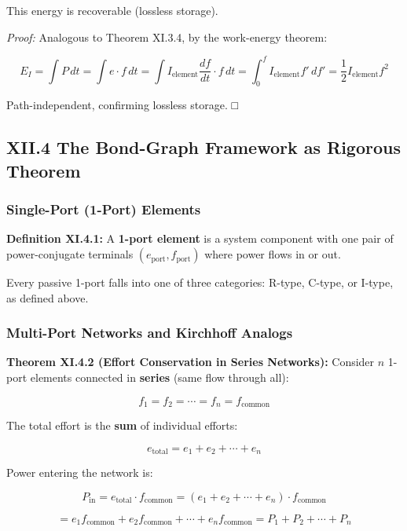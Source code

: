 \documentclass[
]{article}
\begin{document}
This energy is recoverable (lossless storage).

\emph{Proof:} Analogous to Theorem XI.3.4, by the work-energy theorem:

\[E_I = \int P\,dt = \int e \cdot f\,dt = \int I_{\text{element}} \frac{df}{dt} \cdot f\,dt = \int_0^f I_{\text{element}} f'\,df' = \frac{1}{2}I_{\text{element}} f^2\]

Path-independent, confirming lossless storage. □

\subsection{XII.4 The Bond-Graph Framework as Rigorous
Theorem}\label{xii.4-the-bond-graph-framework-as-rigorous-theorem}

\subsubsection{Single-Port (1-Port)
Elements}\label{single-port-1-port-elements}

\textbf{Definition XI.4.1:} A \textbf{1-port element} is a system
component with one pair of power-conjugate terminals
\((e_{\text{port}}, f_{\text{port}})\) where power flows in or out.

Every passive 1-port falls into one of three categories: R-type, C-type,
or I-type, as defined above.

\subsubsection{Multi-Port Networks and Kirchhoff
Analogs}\label{multi-port-networks-and-kirchhoff-analogs}

\textbf{Theorem XI.4.2 (Effort Conservation in Series Networks):}
Consider \(n\) 1-port elements connected in \textbf{series} (same flow
through all):

\[f_1 = f_2 = \cdots = f_n = f_{\text{common}}\]

The total effort is the \textbf{sum} of individual efforts:

\[e_{\text{total}} = e_1 + e_2 + \cdots + e_n\]

Power entering the network is:

\[P_{\text{in}} = e_{\text{total}} \cdot f_{\text{common}} = (e_1 + e_2 + \cdots + e_n) \cdot f_{\text{common}}\]

\[= e_1 f_{\text{common}} + e_2 f_{\text{common}} + \cdots + e_n f_{\text{common}} = P_1 + P_2 + \cdots + P_n\]
\end{document}
